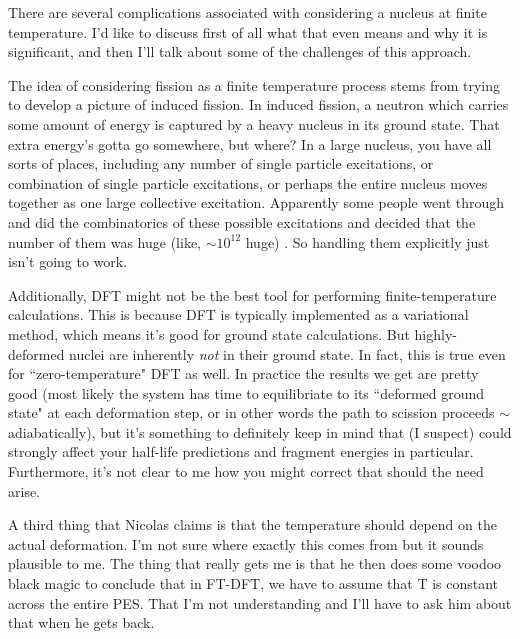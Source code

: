 There are several complications associated with considering a nucleus at finite temperature. I'd like to discuss first of all what that even means and why it is significant, and then I'll talk about some of the challenges of this approach.

The idea of considering fission as a finite temperature process stems from trying to develop a picture of induced fission. In induced fission, a neutron which carries some amount of energy is captured by a heavy nucleus in its ground state. That extra energy's gotta go somewhere, but where? In a large nucleus, you have all sorts of places, including any number of single particle excitations, or combination of single particle excitations, or perhaps the entire nucleus moves together as one large collective excitation. Apparently some people went through and did the combinatorics of these possible excitations and decided that the number of them was huge (like, $\sim10^{12}$ huge) \cite{Hilaire2012}. So handling them explicitly just isn't going to work.

Additionally, DFT might not be the best tool for performing finite-temperature calculations. This is because DFT is typically implemented as a variational method, which means it's good for ground state calculations. But highly-deformed nuclei are inherently \textit{not} in their ground state. In fact, this is true even for ``zero-temperature" DFT as well. In practice the results we get are pretty good (most likely the system has time to equilibriate to its ``deformed ground state" at each deformation step, or in other words the path to scission proceeds $\sim$adiabatically), but it's something to definitely keep in mind that (I suspect) could strongly affect your half-life predictions and fragment energies in particular. Furthermore, it's not clear to me how you might correct that should the need arise.

A third thing that Nicolas claims is that the temperature should depend on the actual deformation. I'm not sure where exactly this comes from but it sounds plausible to me. The thing that really gets me is that he then does some voodoo black magic to conclude that in FT-DFT, we have to assume that T is constant across the entire PES. That I'm not understanding and I'll have to ask him about that when he gets back.
